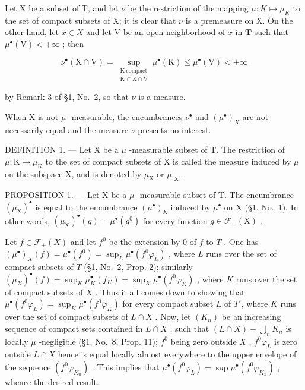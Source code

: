 Let X be a subset of T, and let \(\nu\) be the restriction of the mapping \(\mu: K \mapsto \mu_{K}\) to the set of compact subsets of X; it is clear that \(\nu\) is a premeasure on X. On the other hand, let \(x \in X\) and let V be an open neighborhood of \(x\) in \(\mathbf{T}\) such that \(\mu^{\bullet}(\mathrm{V}) < +\infty\) ; then

\[
\nu^{\bullet}(\mathrm{X}\cap \mathrm{V}) = \sup_{\substack{\mathrm{K\ compact}\\ \mathrm{K}\subset \mathrm{X}\cap \mathrm{V}}}\mu^{\bullet}(\mathrm{K})\leqslant \mu^{\bullet}(\mathrm{V}) <   + \infty
\]

by Remark 3 of §1, No.~2, so that \(\nu\) is a measure.

When X is not \(\mu\) -measurable, the encumbrances \(\nu^{\bullet}\) and \((\mu^{\bullet})_{X}\) are not necessarily equal and the measure \(\nu\) presents no interest.

DEFINITION 1. --- Let X be a \(\mu\) -measurable subset of T. The restriction of \(\mu: \mathrm{K} \mapsto \mu_{\mathrm{K}}\) to the set of compact subsets of X is called the measure induced by \(\mu\) on the subspace X, and is denoted by \(\mu_{\mathrm{X}}\) or \(\mu|_{\mathrm{X}}\) .

PROPOSITION 1. --- Let X be a \(\mu\) -measurable subset of T. The encumbrance \((\mu_{\mathrm{X}})^{\bullet}\) is equal to the encumbrance \((\mu^{\bullet})_{\mathrm{X}}\) induced by \(\mu^{\bullet}\) on X (§1, No.~1). In other words, \((\mu_{\mathrm{X}})^{\bullet}(g) = \mu^{\bullet}(g^{0})\) for every function \(g \in \mathcal{F}_{+}(\mathrm{X})\) .

Let \(f \in \mathcal{F}_{+}(X)\) and let \(f^{0}\) be the extension by 0 of \(f\) to \(T\) . One has \((\mu^{\bullet})_{X}(f) = \mu^{\bullet}(f^{0}) = \sup_{L} \mu^{\bullet}(f^{0}\varphi_{L})\) , where \(L\) runs over the set of compact subsets of \(T\) (§1, No.~2, Prop. 2); similarly \((\mu_{X})^{\bullet}(f) = \sup_{K} \mu_{K}^{\bullet}(f_{K}) = \sup_{K} \mu^{\bullet}(f^{0}\varphi_{K})\) , where \(K\) runs over the set of compact subsets of \(X\) . Thus it all comes down to showing that \(\mu^{\bullet}(f^{0}\varphi_{L}) = \sup_{K} \mu^{\bullet}(f^{0}\varphi_{K})\) for every compact subset \(L\) of \(T\) , where \(K\) runs over the set of compact subsets of \(L \cap X\) . Now, let \((K_{n})\) be an increasing sequence of compact sets contained in \(L \cap X\) , such that \((L \cap X) - \bigcup_{n} K_{n}\) is locally \(\mu\) -negligible (§1, No.~8, Prop. 11); \(f^{0}\) being zero outside \(X\) , \(f^{0}\varphi_{L}\) is zero outside \(L \cap X\) hence is equal locally almost everywhere to the upper envelope of the sequence \((f^{0}\varphi_{K_{n}})\) . This implies that \(\mu^{\bullet}(f^{0}\varphi_{L}) = \sup \mu^{\bullet}(f^{0}\varphi_{K_{n}})\) , whence the desired result.


